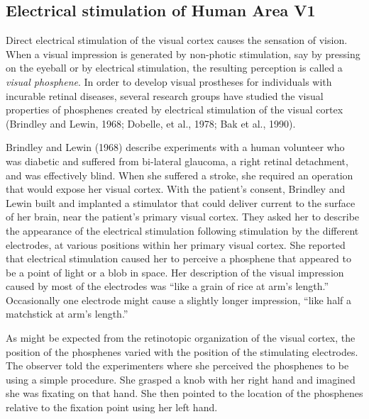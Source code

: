 \subsection*{Electrical stimulation of Human Area V1}
Direct electrical stimulation of the visual cortex causes the
sensation of vision.  When a visual impression is generated by
non-photic stimulation, say by pressing on the eyeball or by
electrical stimulation, the resulting perception is called a {\em
visual phosphene}.  In order to develop visual prostheses for
individuals with incurable retinal diseases, several research groups have
studied the visual properties of phosphenes created by electrical
stimulation of the visual cortex (Brindley and Lewin, 1968; Dobelle,
et al., 1978; Bak et al., 1990).

Brindley and Lewin (1968) describe experiments with a human volunteer
who was diabetic and suffered from bi-lateral glaucoma, a right
retinal detachment, and was effectively blind.  When she suffered a
stroke, she required an operation that would expose her visual cortex.
With the patient's consent, Brindley and Lewin built and implanted
a stimulator that could deliver current to the surface of her brain,
near the patient's primary visual cortex.  They asked her to describe
the appearance of the electrical stimulation following stimulation by
the different electrodes, at various positions within her primary
visual cortex.  She reported that electrical stimulation caused her to
perceive a phosphene that appeared to be a point of light or a blob in
space.  Her description of the visual impression caused by most of the
electrodes was ``like a grain of rice at arm's length.''  Occasionally
one electrode might cause a slightly longer impression, ``like half a
matchstick at arm's length.''

As might be expected from the retinotopic organization of the visual
cortex, the position of the phosphenes varied with the position of the
stimulating electrodes.  The observer told the experimenters where she
perceived the phosphenes to be using a simple procedure.  She grasped
a knob with her right hand and imagined she was fixating on that hand.
She then pointed to the location of the phosphenes relative to the
fixation point using her left hand.

